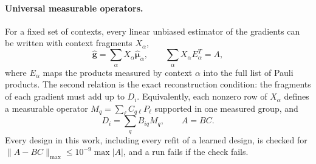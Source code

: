 \documentclass[aps,pra,reprint,superscriptaddress,nofootinbib]{revtex4-2}
\begin{document}
\paragraph{Universal measurable operators.} For a fixed set of contexts, every linear unbiased estimator of the gradients can be written with context fragments $X_\alpha$,
\begin{equation}
\hat{\boldsymbol g}=\sum_\alpha X_\alpha\hat{\boldsymbol\mu}_\alpha ,\qquad
\sum_\alpha X_\alpha E_\alpha^{T}=A ,
\label{eq:recon}
\end{equation}
where $E_\alpha$ maps the products measured by context $\alpha$ into the full list of Pauli products. The second relation is the exact reconstruction condition: the fragments of each gradient must add up to $D_i$. Equivalently, each nonzero row of $X_\alpha$ defines a measurable operator $M_q=\sum_\ell C_{q\ell}P_\ell$ supported in one measured group, and
\begin{equation}
D_i=\sum_q B_{iq}M_q ,\qquad A=BC .
\end{equation}
Every design in this work, including every refit of a learned design, is checked for $\lVert A-BC\rVert_{\max}\le10^{-9}\max\lvert A\rvert$, and a run fails if the check fails.
\end{document}
